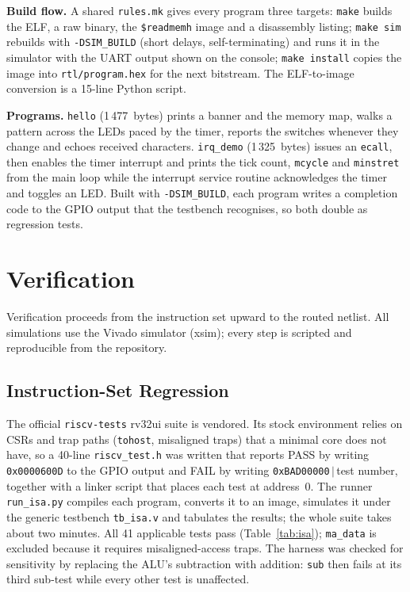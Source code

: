 \documentclass[journal,10pt]{IEEEtran}
\newcommand{\reg}[1]{\texttt{#1}}
\begin{document}
\textbf{Build flow.} A shared \reg{rules.mk} gives every program three
targets: \reg{make} builds the ELF, a raw binary, the \reg{\$readmemh} image
and a disassembly listing; \reg{make sim} rebuilds with \reg{-DSIM\_BUILD}
(short delays, self-terminating) and runs it in the simulator with the UART
output shown on the console; \reg{make install} copies the image into
\reg{rtl/program.hex} for the next bitstream. The ELF-to-image conversion is
a 15-line Python script.

\textbf{Programs.} \reg{hello} (1\,477~bytes) prints a banner and the memory
map, walks a pattern across the LEDs paced by the timer, reports the
switches whenever they change and echoes received characters.
\reg{irq\_demo} (1\,325~bytes) issues an \reg{ecall}, then enables the timer
interrupt and prints the tick count, \reg{mcycle} and \reg{minstret} from
the main loop while the interrupt service routine acknowledges the timer and
toggles an LED. Built with \reg{-DSIM\_BUILD}, each program writes a
completion code to the GPIO output that the testbench recognises, so both
double as regression tests.

\section{Verification}\label{sec:verif}
Verification proceeds from the instruction set upward to the routed netlist.
All simulations use the Vivado simulator (xsim); every step is scripted and
reproducible from the repository.

\subsection{Instruction-Set Regression}
The official \reg{riscv-tests} rv32ui suite \cite{riscv-tests} is vendored.
Its stock environment relies on CSRs and trap paths (\reg{tohost},
misaligned traps) that a minimal core does not have, so a 40-line
\reg{riscv\_test.h} was written that reports PASS by writing
\reg{0x0000600D} to the GPIO output and FAIL by writing
\reg{0xBAD00000}\,$|$\,test number, together with a linker script that places
each test at address~0. The runner \reg{run\_isa.py} compiles each program,
converts it to an image, simulates it under the generic testbench
\reg{tb\_isa.v} and tabulates the results; the whole suite takes about two
minutes. All 41 applicable tests pass (Table~\ref{tab:isa}); \reg{ma\_data}
is excluded because it requires misaligned-access traps. The harness was
checked for sensitivity by replacing the ALU's subtraction with addition:
\reg{sub} then fails at its third sub-test while every other test is
unaffected.
\end{document}
